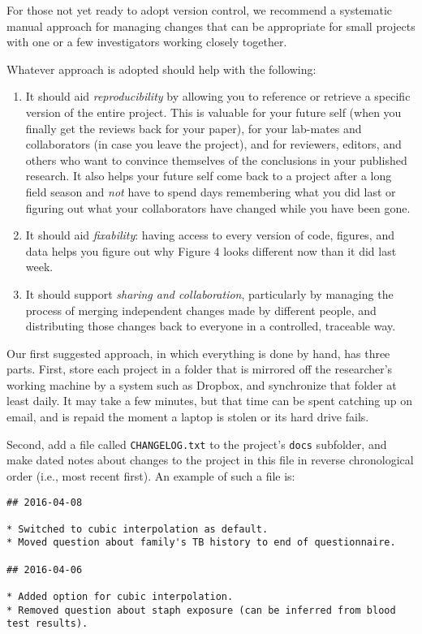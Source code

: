 \documentclass[10pt]{article}
\begin{document}
For those not yet ready to adopt version control, we recommend a
systematic manual approach for managing changes that can be appropriate
for small projects with one or a few investigators working closely
together.

Whatever approach is adopted should help with the following:

\begin{enumerate}
\item
  It should aid \emph{reproducibility} by allowing you to reference or
  retrieve a specific version of the entire project. This is valuable
  for your future self (when you finally get the reviews back for your
  paper), for your lab-mates and collaborators (in case you leave the
  project), and for reviewers, editors, and others who want to convince
  themselves of the conclusions in your published research. It also
  helps your future self come back to a project after a long field
  season and \emph{not} have to spend days remembering what you did last
  or figuring out what your collaborators have changed while you have
  been gone.
\item
  It should aid \emph{fixability}: having access to every version of
  code, figures, and data helps you figure out why Figure 4 looks
  different now than it did last week.
\item
  It should support \emph{sharing and collaboration}, particularly by
  managing the process of merging independent changes made by different
  people, and distributing those changes back to everyone in a
  controlled, traceable way.
\end{enumerate}

Our first suggested approach, in which everything is done by hand, has
three parts. First, store each project in a folder that is mirrored off
the researcher's working machine by a system such as Dropbox, and
synchronize that folder at least daily. It may take a few minutes, but
that time can be spent catching up on email, and is repaid the moment a
laptop is stolen or its hard drive fails.

Second, add a file called \texttt{CHANGELOG.txt} to the project's
\texttt{docs} subfolder, and make dated notes about changes to the
project in this file in reverse chronological order (i.e., most recent
first). An example of such a file is:

\begin{verbatim}
## 2016-04-08

* Switched to cubic interpolation as default.
* Moved question about family's TB history to end of questionnaire.

## 2016-04-06

* Added option for cubic interpolation.
* Removed question about staph exposure (can be inferred from blood test results).
\end{verbatim}
\end{document}
